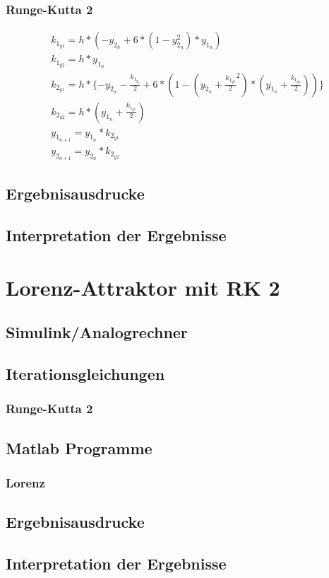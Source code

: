 \documentclass[10pt]{scrartcl}
\begin{document}
		\subsubsection{Runge-Kutta 2}	
		\begin{align}
			&k_{1_{y1}} = h*(-y_{2_n}+6*(1-y_{2_n}^{2})*y_{1_n})\\
			&k_{1_{y2}} = h*y_{1_n}\\
			&k_{2_{y1}} = h*\lbrace -y_{2_n} - \frac{k_{1_{y_2}}}{2} + 6 * (1-(y_{2_n}+\frac{k_{1_{y2}}}{2}^{2})*(y_{1_n}+\frac{k_{1_{y1}}}{2}))\rbrace\\			
			&k_{2_{y2}} = h*(y_{1_n}+\frac{k_{1_{y1}}}{2})\\			
			&y_{1_{n+1}} = y_{1_{n}} * k_{2_{y1}}\\
			&y_{2_{n+1}} = y_{2_{n}} * k_{2_{y2}}
		\end{align}		
	\subsection{Ergebnisausdrucke}	
		
	\subsection{Interpretation der Ergebnisse}	
	
\section{Lorenz-Attraktor mit RK 2}	
	\subsection{Simulink/Analogrechner}
	
	\subsection{Iterationsgleichungen}
		\subsubsection{Runge-Kutta 2}

	\subsection{Matlab Programme}
		\subsubsection{Lorenz}			

	\subsection{Ergebnisausdrucke}	
		
	\subsection{Interpretation der Ergebnisse}				
\end{document}
